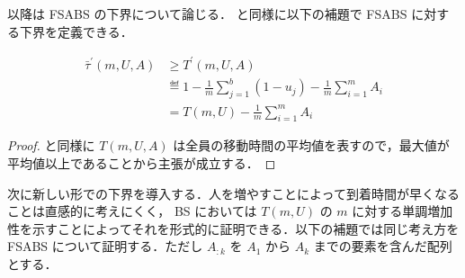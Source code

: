 以降は FSABS の下界について論じる．  と同様に以下の補題で FSABS に対する下界を定義できる．
\begin{lemma}\label{lemma:fsabs-lower-bound-absolute}
  \begin{align}
    \bar\tau^{\prime}(m, U, A) &\geq T^\prime(m, U, A) \\
                      &\eqdef 1 - \frac{1}{m}\sum_{j = 1}^b (1 - u_j) - \frac{1}{m}\sum_{i = 1}^{m} A_i \\
                      &= T(m, U) - \frac{1}{m}\sum_{i = 1}^{m} A_i
  \end{align}
\end{lemma}
\begin{proof}
   と同様に $T(m, U, A)$ は全員の移動時間の平均値を表すので，最大値が平均値以上であることから主張が成立する．
\end{proof}

次に新しい形での下界を導入する．人を増やすことによって到着時間が早くなることは直感的に考えにくく， BS においては $T(m, U)$ の $m$ に対する単調増加性を示すことによってそれを形式的に証明できる．以下の補題では同じ考え方を FSABS について証明する．ただし $A_{:k}$ を $A_1$ から $A_k$ までの要素を含んだ配列とする．

